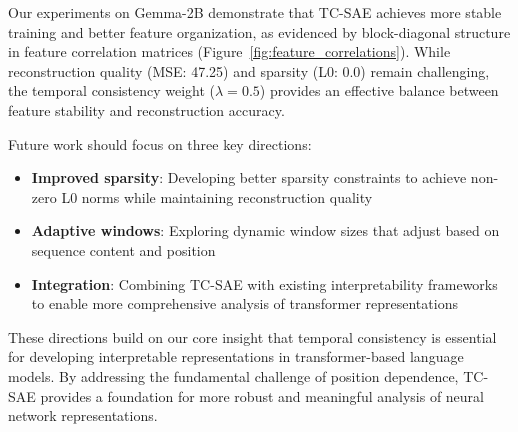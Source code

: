 \documentclass{article} %
\begin{document}
Our experiments on Gemma-2B demonstrate that TC-SAE achieves more stable training and better feature organization, as evidenced by block-diagonal structure in feature correlation matrices (Figure~\ref{fig:feature_correlations}). While reconstruction quality (MSE: 47.25) and sparsity (L0: 0.0) remain challenging, the temporal consistency weight ($\lambda=0.5$) provides an effective balance between feature stability and reconstruction accuracy.

Future work should focus on three key directions:
\begin{itemize}
    \item \textbf{Improved sparsity}: Developing better sparsity constraints to achieve non-zero L0 norms while maintaining reconstruction quality
    \item \textbf{Adaptive windows}: Exploring dynamic window sizes that adjust based on sequence content and position
    \item \textbf{Integration}: Combining TC-SAE with existing interpretability frameworks to enable more comprehensive analysis of transformer representations
\end{itemize}

These directions build on our core insight that temporal consistency is essential for developing interpretable representations in transformer-based language models. By addressing the fundamental challenge of position dependence, TC-SAE provides a foundation for more robust and meaningful analysis of neural network representations.



\end{document}
